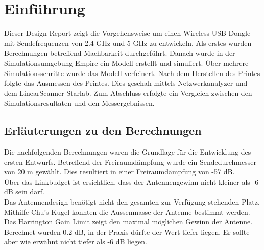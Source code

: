 \section{Einführung}
Dieser Design Report zeigt die Vorgehensweise um einen Wireless USB-Dongle mit Sendefrequenzen von 2.4 GHz und 5 GHz zu entwickeln. Als erstes wurden Berechnungen betreffend Machbarkeit durchgeführt. Danach wurde in der Simulationsumgebung Empire ein Modell erstellt und simuliert. Über mehrere Simulationsschritte wurde das Modell verfeinert. Nach dem Herstellen des Printes folgte das Ausmessen des Printes. Dies geschah mittels Netzwerkanalyzer und dem LinearScanner Starlab. Zum Abschluss erfolgte ein Vergleich zwischen den Simulationsresultaten und den Messergebnissen.

\subsection{Erläuterungen zu den Berechnungen}
Die nachfolgenden Berechnungen waren die Grundlage für die Entwicklung des ersten Entwurfs. 
Betreffend der Freiraumdämpfung wurde ein Sendedurchmesser von 20 m gewählt. Dies resultiert in einer Freiraumdämpfung von -57 dB.\\
Über das Linkbudget ist ersichtlich, dass der Antennengewinn nicht kleiner als -6 dB sein darf.\\
Das Antennendesign benötigt nicht den gesamten zur Verfügung stehenden Platz. Mithilfe Chu's Kugel konnten die Aussenmasse der Antenne bestimmt werden. Das Harrington Gain Limit zeigt den maximal möglichen Gewinn der Antenne. Berechnet wurden 0.2 dB, in der Praxis dürfte der Wert tiefer liegen. Er sollte aber wie erwähnt nicht tiefer als -6 dB liegen.



